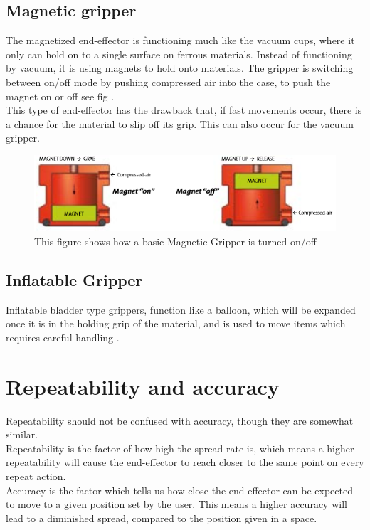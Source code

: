 \subsection{Magnetic gripper}
The magnetized end-effector is functioning much like the vacuum cups, where it only can hold on to a single surface on ferrous materials. Instead of functioning by vacuum, it is using magnets to hold onto materials. The gripper is switching between on/off mode by pushing compressed air into the case, to push the magnet on or off see fig \cite{MagnetCite}.\\
This type of end-effector has the drawback that, if fast movements occur, there is a chance for the material to slip off its grip. This can also occur for the vacuum gripper\cite{Gripper2}.\\

\begin{figure}[H]
    \centering
    \includegraphics{TechnicalAnlysis/MagnetGripper.PNG}
    \caption{This figure shows how a basic Magnetic Gripper is turned on/off \cite{MagnetCite}}
    \label{fig:MagnetGrip}
\end{figure}

\subsection{Inflatable Gripper}
Inflatable bladder type grippers, function like a balloon, which will be expanded once it is in the holding grip of the material, and is used to move items which requires careful handling \cite{Gripper3}.\\

\section{Repeatability and accuracy}
Repeatability should not be confused with accuracy, though they are somewhat similar.\\
Repeatability is the factor of how high the spread rate is, which means a higher repeatability will cause the end-effector to reach closer to the same point on every repeat action.\\
Accuracy is the factor which tells us how close the end-effector can be expected to move to a given position set by the user. This means a higher accuracy will lead to a diminished spread, compared to the position given in a space\cite{RepeatWhat}.\\

